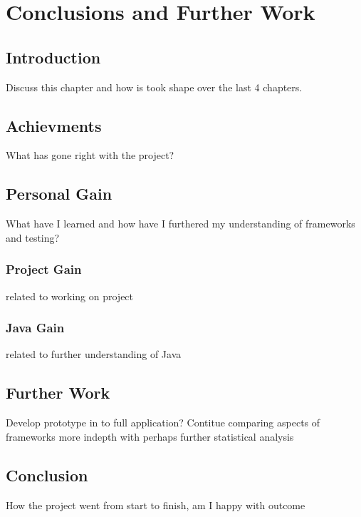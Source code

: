 \chapter*{Conclusions and Further Work}
\section{Introduction}
Discuss this chapter and how is took shape over the last 4 chapters.
\section{Achievments}
What has gone right with the project?

\section{Personal Gain}
What have I learned and how have I furthered my understanding of frameworks and testing?
\subsection{Project Gain}
related to working on project
\subsection{Java Gain}
related to further understanding of Java

\section{Further Work}
Develop prototype in to full application? Contitue comparing aspects of frameworks
more indepth with perhaps further statistical analysis
\section{Conclusion}
How the project went from start to finish, am I happy with outcome